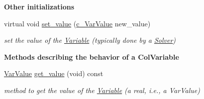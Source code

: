 \begin{Indent}\textbf{ Other initializations}\par
\begin{DoxyCompactItemize}
\item 
virtual void \mbox{\hyperlink{class_s_m_spp__di__unipi__it_1_1_col_variable_a563c1c2ac668d64ccd46176cc6e38ab8}{set\+\_\+value}} (\mbox{\hyperlink{class_s_m_spp__di__unipi__it_1_1_col_variable_aa51e8c6ea70ce11b2c28485c5d9f3ed0}{c\+\_\+\+Var\+Value}} new\+\_\+value)
\begin{DoxyCompactList}\small\item\em set the value of the \mbox{\hyperlink{class_s_m_spp__di__unipi__it_1_1_variable}{Variable}} (typically done by a \mbox{\hyperlink{class_s_m_spp__di__unipi__it_1_1_solver}{Solver}}) \end{DoxyCompactList}\end{DoxyCompactItemize}
\end{Indent}
\begin{Indent}\textbf{ Methods describing the behavior of a Col\+Variable}\par
\begin{DoxyCompactItemize}
\item 
\mbox{\label{class_s_m_spp__di__unipi__it_1_1_col_variable_a36be759909a064f15de0c585dccc9357}} 
\mbox{\hyperlink{class_s_m_spp__di__unipi__it_1_1_col_variable_a5f7c601f4a24317327fbd91b9c7cd951}{Var\+Value}} \mbox{\hyperlink{class_s_m_spp__di__unipi__it_1_1_col_variable_a36be759909a064f15de0c585dccc9357}{get\+\_\+value}} (void) const
\begin{DoxyCompactList}\small\item\em method to get the value of the \mbox{\hyperlink{class_s_m_spp__di__unipi__it_1_1_variable}{Variable}} (a real, i.\+e., a Var\+Value) \end{DoxyCompactList}\end{DoxyCompactItemize}
\end{Indent}
